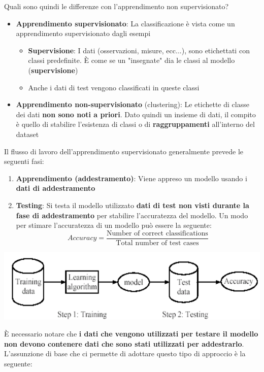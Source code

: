 \documentclass[12pt]{article}
\begin{document}
Quali sono quindi le differenze con l'apprendimento non supervisionato?
\begin{itemize}
    \item \textbf{Apprendimento supervisionato}: La classificazione è vista come un apprendimento supervisionato dagli esempi
    \begin{itemize}
        \item \textbf{Supervisione}: I dati (osservazioni, misure, ecc...), sono etichettati con classi predefinite. È come se un "insegnate" dia le classi al modello (\textbf{supervisione})
        \item Anche i dati di test vengono classificati in queste classi
    \end{itemize}
    \item \textbf{Apprendimento non-supervisionato} (clustering): Le etichette di classe dei dati \textbf{non sono noti a priori}. Dato quindi un insieme di dati, il compito è quello di stabilire l'esistenza di classi o di \textbf{raggruppamenti} all'interno del dataset
\end{itemize}
\newpage
\noindent
Il flusso di lavoro dell'apprendimento supervisionato generalmente prevede le seguenti fasi:
\begin{enumerate}
    \item \textbf{Apprendimento (addestramento)}: Viene appreso un modello usando i \textbf{dati di addestramento}
    \item \textbf{Testing}: Si testa il modello utilizzato \textbf{dati di test non visti durante la fase di addestramento} per stabilire l'accuratezza del modello.
    Un modo per stimare l'accuratezza di un modello può essere la seguente:
    $$Accuracy = \frac{\textrm{Number of correct classifications}}{\textrm{Total number of test cases}}$$
\end{enumerate}
\begin{center}
    \includegraphics[width =0.80\linewidth]{Images/69.PNG}
\end{center}
È necessario notare che \textbf{i dati che vengono utilizzati per testare il modello non devono contenere dati che sono stati utilizzati per addestrarlo}.
L'assunzione di base che ci permette di adottare questo tipo di approccio è la seguente: \newline
\end{document}
